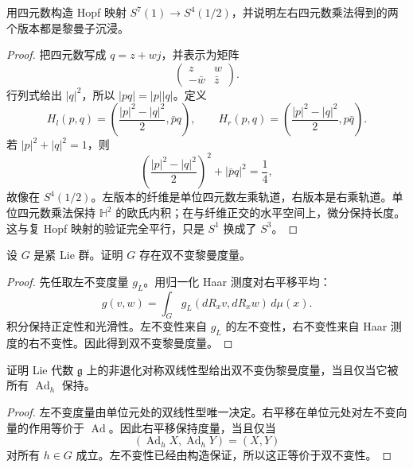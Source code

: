 \documentclass[11pt,a4paper,openany]{ctexbook}
\numberwithin{equation}{chapter}
\begin{document}
\begin{problem}
用四元数构造 Hopf 映射 \(S^7(1)\to S^4(1/2)\)，并说明左右四元数乘法得到的两个版本都是黎曼子沉浸。
\end{problem}
\begin{proof}
把四元数写成 \(q=z+wj\)，并表示为矩阵
\[
\begin{pmatrix}z&w\\-\bar w&\bar z\end{pmatrix}.
\]
行列式给出 \(|q|^2\)，所以 \(|pq|=|p||q|\)。定义
\[
H_l(p,q)=\left(\frac{|p|^2-|q|^2}{2},\bar p q\right),\qquad
H_r(p,q)=\left(\frac{|p|^2-|q|^2}{2},p\bar q\right).
\]
若 \(|p|^2+|q|^2=1\)，则
\[
\left(\frac{|p|^2-|q|^2}{2}\right)^2+|\bar pq|^2=\frac14,
\]
故像在 \(S^4(1/2)\)。左版本的纤维是单位四元数左乘轨道，右版本是右乘轨道。单位四元数乘法保持 \(\mathbb H^2\) 的欧氏内积；在与纤维正交的水平空间上，微分保持长度。这与复 Hopf 映射的验证完全平行，只是 \(S^1\) 换成了 \(S^3\)。
\end{proof}

\begin{problem}
设 \(G\) 是紧 Lie 群。证明 \(G\) 存在双不变黎曼度量。
\end{problem}
\begin{proof}
先任取左不变度量 \(g_L\)。用归一化 Haar 测度对右平移平均：
\[
g(v,w)=\int_G g_L(dR_xv,dR_xw)\,d\mu(x).
\]
积分保持正定性和光滑性。左不变性来自 \(g_L\) 的左不变性，右不变性来自 Haar 测度的右不变性。因此得到双不变黎曼度量。
\end{proof}

\begin{problem}
证明 Lie 代数 \(\mathfrak g\) 上的非退化对称双线性型给出双不变伪黎曼度量，当且仅当它被所有 \(\operatorname{Ad}_h\) 保持。
\end{problem}
\begin{proof}
左不变度量由单位元处的双线性型唯一决定。右平移在单位元处对左不变向量的作用等价于 \(\operatorname{Ad}\)。因此右平移保持度量，当且仅当
\[
(\operatorname{Ad}_hX,\operatorname{Ad}_hY)=(X,Y)
\]
对所有 \(h\in G\) 成立。左不变性已经由构造保证，所以这正等价于双不变性。
\end{proof}
\end{document}
